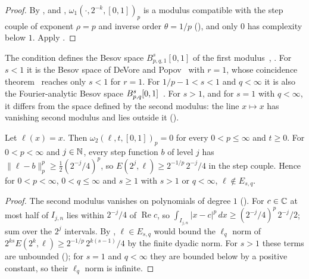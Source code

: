 \begin{proof}
\leanok
By ,  and
, $\omega_1(\cdot, 2^{-k}, [0, 1])_p$ is a modulus compatible
with the step couple of exponent $\rho = p$ and inverse order $\theta = 1/p$
(), and only $0$ has complexity below $1$. Apply
.
\end{proof}

The condition defines the Besov space $B^s_{p,q,1}[0, 1]$ of the first
modulus~\cite[(7)]{Oswald2018}, \cite[Theorem~6]{Oswald1980}. For $s < 1$ it is the Besov space
of DeVore and Popov~\cite[(2.4)]{DeVorePopovTAMS} with $r = 1$, whose coincidence
theorem~\cite[Theorem~5.1]{DeVorePopovTAMS} reaches only $s < 1$ for $r = 1$. For
$1/p - 1 < s < 1$ and $q < \infty$ it is also the Fourier-analytic Besov space
$B^{s}_{p,q}[0, 1]$~\cite[(2)]{Oswald2018}. For $s > 1$, and for $s = 1$ with $q < \infty$, it
differs from the space defined by the second modulus: the line $x \mapsto x$ has vanishing second
modulus and lies outside it ().

\begin{lemma}
\label{lem:steps-line}
\leanok
{}
Let $\ell(x) = x$. Then $\omega_2(\ell, t, [0, 1])_p = 0$ for every $0 < p \leq \infty$ and
$t \geq 0$. For $0 < p < \infty$ and $j \in \mathbb{N}$, every step function $b$ of level $j$ has
$\|\ell - b\|_p^p \geq \tfrac12 (2^{-j}/4)^p$, so $E(2^j, \ell) \geq 2^{-1/p} \, 2^{-j}/4$ in the
step couple. Hence for $0 < p < \infty$, $0 < q \leq \infty$ and $s \geq 1$ with $s > 1$ or
$q < \infty$, $\ell \notin E_{s, q}$.
\end{lemma}

\begin{proof}
\leanok
The second modulus vanishes on polynomials of degree $1$ (). For
$c \in \mathbb{C}$ at most half of $I_{j,n}$ lies within $2^{-j}/4$ of $\operatorname{Re} c$, so
$\int_{I_{j,n}} |x - c|^p \, dx \geq (2^{-j}/4)^p \, 2^{-j}/2$; sum over the $2^j$ intervals. By
, $\ell \in E_{s,q}$ would bound the $\ell_q$ norm of
$2^{ks} E(2^k, \ell) \geq 2^{-1/p} \, 2^{k(s - 1)}/4$ by the finite dyadic norm. For $s > 1$ these
terms are unbounded (); for $s = 1$ and $q < \infty$ they are
bounded below by a positive constant, so their $\ell_q$ norm is infinite.
\end{proof}

